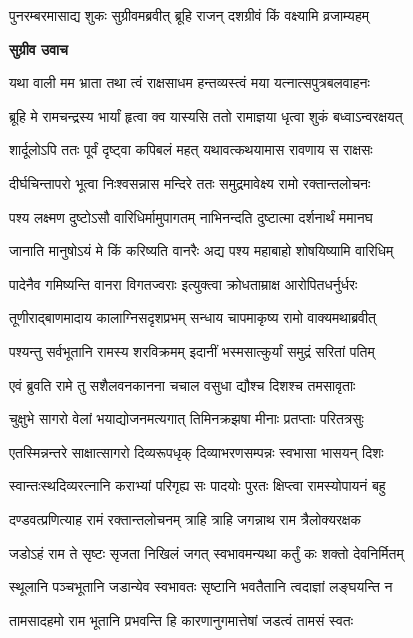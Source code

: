\twolineshloka
{पुनरम्बरमासाद्य शुकः सुग्रीवमब्रवीत्}
{ब्रूहि राजन् दशग्रीवं किं वक्ष्यामि व्रजाम्यहम्} %

\textbf{सुग्रीव उवाच}

\twolineshloka
{यथा वाली मम भ्राता तथा त्वं राक्षसाधम}
{हन्तव्यस्त्वं मया यत्नात्सपुत्रबलवाहनः} %

\twolineshloka
{ब्रूहि मे रामचन्द्रस्य भार्यां हृत्वा क्व यास्यसि}
{ततो रामाज्ञया धृत्वा शुकं बध्वाऽन्वरक्षयत्} %

\twolineshloka
{शार्दूलोऽपि ततः पूर्वं दृष्ट्वा कपिबलं महत्}
{यथावत्कथयामास रावणाय स राक्षसः} %

\twolineshloka
{दीर्घचिन्तापरो भूत्वा निःश्वसन्नास मन्दिरे}
{ततः समुद्रमावेक्ष्य रामो रक्तान्तलोचनः} %

\twolineshloka
{पश्य लक्ष्मण दुष्टोऽसौ वारिधिर्मामुपागतम्}
{नाभिनन्दति दुष्टात्मा दर्शनार्थं ममानघ} %

\twolineshloka
{जानाति मानुषोऽयं मे किं करिष्यति वानरैः}
{अद्य पश्य महाबाहो शोषयिष्यामि वारिधिम्} %

\twolineshloka
{पादेनैव गमिष्यन्ति वानरा विगतज्वराः}
{इत्युक्त्वा क्रोधताम्राक्ष आरोपितधर्नुर्धरः} %

\twolineshloka
{तूणीराद्बाणमादाय कालाग्निसदृशप्रभम्}
{सन्धाय चापमाकृष्य रामो वाक्यमथाब्रवीत्} %

\twolineshloka
{पश्यन्तु सर्वभूतानि रामस्य शरविक्रमम्}
{इदानीं भस्मसात्कुर्यां समुद्रं सरितां पतिम्} %

\twolineshloka
{एवं ब्रुवति रामे तु सशैलवनकानना}
{चचाल वसुधा द्यौश्च दिशश्च तमसावृताः} %

\twolineshloka
{चुक्षुभे सागरो वेलां भयाद्योजनमत्यगात्}
{तिमिनक्रझषा मीनाः प्रतप्ताः परितत्रसुः} %

\twolineshloka
{एतस्मिन्नन्तरे साक्षात्सागरो दिव्यरूपधृक्}
{दिव्याभरणसम्पन्नः स्वभासा भासयन् दिशः} %

\twolineshloka
{स्वान्तःस्थदिव्यरत्नानि कराभ्यां परिगृह्य सः}
{पादयोः पुरतः क्षिप्त्वा रामस्योपायनं बहु} %

\twolineshloka
{दण्डवत्प्रणित्याह रामं रक्तान्तलोचनम्}
{त्राहि त्राहि जगन्नाथ राम त्रैलोक्यरक्षक} %

\twolineshloka
{जडोऽहं राम ते सृष्टः सृजता निखिलं जगत्}
{स्वभावमन्यथा कर्तुं कः शक्तो देवनिर्मितम्} %

\twolineshloka
{स्थूलानि पञ्चभूतानि जडान्येव स्वभावतः}
{सृष्टानि भवतैतानि त्वदाज्ञां लङ्घयन्ति न} %

\twolineshloka
{तामसादहमो राम भूतानि प्रभवन्ति हि}
{कारणानुगमात्तेषां जडत्वं तामसं स्वतः} %

